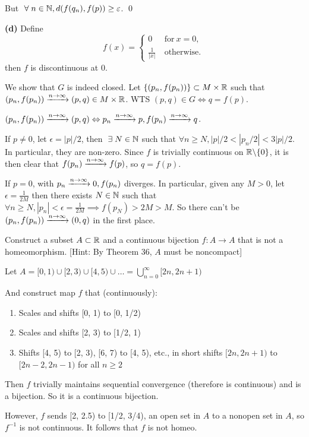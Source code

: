 \documentclass[a4paper, 12pt]{article}
\begin{document}
\begin{solution}
    But $\forall n \in \bbn, d(f(q_n), f(p)) \geq \epsilon$. \contra \qed

    \textbf{(d)} Define \[
        f(x) = \begin{cases}
            0             & \:\text{for}\: x = 0, \\
            \frac{1}{|x|} & \:\text{otherwise}.\:
        \end{cases}
    \]
    then $f$ is discontinuous at $0$.

    We show that $G$ is indeed closed. Let $\{(p_n, f(p_n))\} \subset M \times \mathbb{R}$ such that $(p_n, f(p_n)) \xrightarrow{n \to \infty} (p, q) \in M \times \mathbb{R}$. WTS $(p, q) \in G \Leftrightarrow q = f(p)$.

    $(p_n, f(p_n)) \xrightarrow{n \to \infty} (p, q) \Leftrightarrow p_n \xrightarrow{n \to \infty} p, f(p_n) \xrightarrow{n \to \infty} q$.

    If $p \neq 0$, let $\epsilon = |p|/2$, then $\exists N \in \bbn$ such that $\forall n \geq N, |p|/2 < |p_n/2| < 3|p|/2$. In particular, they are non-zero. Since $f$ is trivially continuous on $\mathbb{R} \backslash \{0\}$, it is then clear that $f(p_n) \xrightarrow{n \to \infty} f(p)$, so $q = f(p)$.

    If $p = 0$, with $p_n \xrightarrow{n \to \infty} 0, f(p_n)$ diverges. In particular, given any $M > 0$, let $\epsilon = \frac{1}{2M}$ then there exists $N \in \mathbb{N}$ such that $\forall n \geq N, |p_n| < \epsilon = \frac{1}{2M} \implies f(p_N) > 2M > M$. So there can't be $(p_n, f(p_n)) \xrightarrow{n \to \infty} (0, q)$ in the first place.
\end{solution}

\begin{problem} [2.49*]
Construct a subset $A \subset \mathbb{R}$ and a continuous bijection $f: A \to A$ that is not a homeomorphism. [Hint: By Theorem 36, $A$ must be noncompact]
\end{problem}
\begin{solution}
Let $A = [0, 1)  \cup [2, 3) \cup [4, 5) \cup \dots = \bigcup_{n=0}^{\infty} [2n, 2n+1)$

And construct map $f$ that (continuously):
\begin{enumerate}
    \item Scales and shifts [0, 1) to [0, 1/2)
    \item Scales and shifts [2, 3) to [1/2, 1)
    \item Shifts [4, 5) to [2, 3), [6, 7) to [4, 5), etc., in short shifts $[2n, 2n+1)$ to $[2n-2, 2n-1)$ for all $n \geq 2$
\end{enumerate}

Then $f$ trivially maintains sequential convergence (therefore is continuous) and is a bijection. So it is a continuous bijection.

However, $f$ sends [2, 2.5) to [1/2, 3/4), an open set in $A$ to a nonopen set in $A$, so $f^{-1}$ is not continuous. It follows that $f$ is not homeo.
\end{solution}
\end{document}
